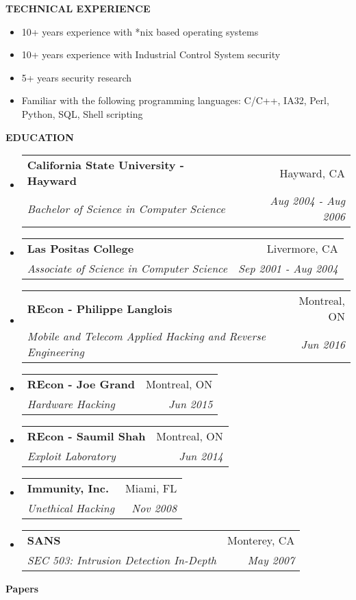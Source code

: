\documentclass[letterpaper,11pt]{article}
\makeatletter
\newcommand{\resheading}[1]{{\large \colorbox{mygrey}{\begin{minipage}{\textwidth}{\textbf{#1 \vphantom{p\^{E}}}}\end{minipage}}}}
\newcommand{\ressubheading}[4]{
\begin{tabular*}{7.0in}{l@{\extracolsep{\fill}}r}
		\textbf{#1} & #2 \\
		\textit{#3} & \textit{#4} \\
\end{tabular*}\vspace{-6pt}}
\newif\ificstraining
\newif\ifpapers
\makeatother
\begin{document}
	\resheading{TECHNICAL EXPERIENCE}
		\begin{itemize}
    		\item 10+ years experience with *nix based operating systems
			\item 10+ years experience with Industrial Control System security
			\item 5+ years security research		    	
			\item Familiar with the following programming languages: C/C++, IA32, Perl, Python, SQL, Shell scripting
		\end{itemize}	
 	\resheading{EDUCATION}
	\begin{itemize}
		\item
		\ressubheading{California State University - Hayward}{Hayward, CA}{Bachelor of Science in Computer Science}{Aug 2004 - Aug 2006}
		\item
		\ressubheading{Las Positas College}{Livermore, CA}{Associate of Science in Computer Science}{Sep 2001 - Aug 2004}
		\item
		\ressubheading{REcon - Philippe Langlois}{Montreal, ON}{Mobile and Telecom Applied Hacking and Reverse Engineering}{Jun 2016}
		\item
		\ressubheading{REcon - Joe Grand}{Montreal, ON}{Hardware Hacking}{Jun 2015}
		\item
		\ressubheading{REcon - Saumil Shah}{Montreal, ON}{Exploit Laboratory}{Jun 2014}
		\item
		\ressubheading{Immunity, Inc.}{Miami, FL}{Unethical Hacking}{Nov 2008}
		\item
		\ressubheading{SANS}{Monterey, CA}{SEC 503: Intrusion Detection In-Depth}{May 2007}
		\ificstraining
			\item
			\ressubheading{Falck}{Houma, LA}{BOSIET: Basic Offshore Safety Induction and Emergency Training - Expired}{Aug 2015}
		\fi
	\end{itemize}
%
%
	\ifpapers
	 	\resheading{Papers}
\end{document}
